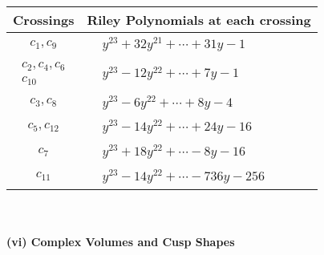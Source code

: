 \documentclass[1p]{elsarticle_modified}
\theoremstyle{definition}
\begin{document}
\begin{tabular}{m{50pt}|m{274pt}}
Crossings & \hspace{64pt}Riley Polynomials at each crossing \\
\hline $$\begin{aligned}c_{1},c_{9}\end{aligned}$$&$\begin{aligned}
&y^{23}+32 y^{21}+\cdots+31 y-1
\end{aligned}$\\
\hline $$\begin{aligned}c_{2},c_{4},c_{6}\\c_{10}\end{aligned}$$&$\begin{aligned}
&y^{23}-12 y^{22}+\cdots+7 y-1
\end{aligned}$\\
\hline $$\begin{aligned}c_{3},c_{8}\end{aligned}$$&$\begin{aligned}
&y^{23}-6 y^{22}+\cdots+8 y-4
\end{aligned}$\\
\hline $$\begin{aligned}c_{5},c_{12}\end{aligned}$$&$\begin{aligned}
&y^{23}-14 y^{22}+\cdots+24 y-16
\end{aligned}$\\
\hline $$\begin{aligned}c_{7}\end{aligned}$$&$\begin{aligned}
&y^{23}+18 y^{22}+\cdots-8 y-16
\end{aligned}$\\
\hline $$\begin{aligned}c_{11}\end{aligned}$$&$\begin{aligned}
&y^{23}-14 y^{22}+\cdots-736 y-256
\end{aligned}$\\
\hline
\end{tabular}\\~\\
\newpage\flushleft \textbf{(vi) Complex Volumes and Cusp Shapes}
\end{document}
